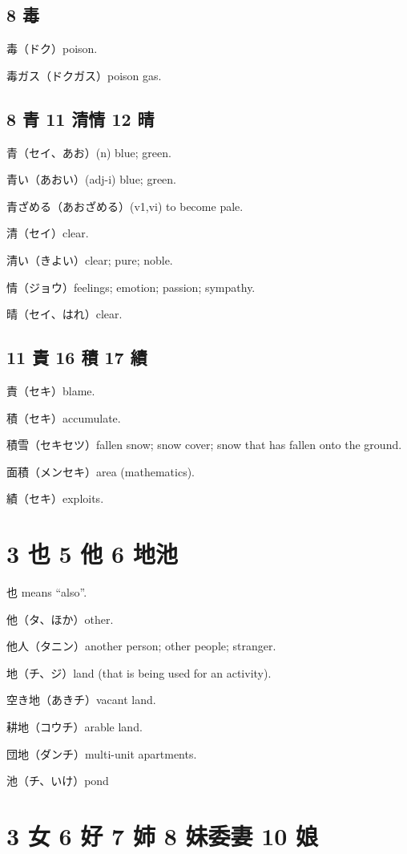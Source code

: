 \subsection{8 毒}

毒（ドク）poison.

毒ガス（ドクガス）poison gas.

\subsection{8 青 11 清情 12 晴}

青（セイ、あお）(n) blue; green.

青い（あおい）(adj-i) blue; green.

青ざめる（あおざめる）(v1,vi) to become pale.

清（セイ）clear.

清い（きよい）clear; pure; noble.

情（ジョウ）feelings; emotion; passion; sympathy.

晴（セイ、はれ）clear.

\subsection{11 責 16 積 17 績}

責（セキ）blame.

積（セキ）accumulate.

積雪（セキセツ）fallen snow;
snow cover;
snow that has fallen onto the ground.

面積（メンセキ）area (mathematics).

績（セキ）exploits.

\section{3 也 5 他 6 地池}

也 means ``also''.

他（タ、ほか）other.

他人（タニン）another person; other people; stranger.

地（チ、ジ）land (that is being used for an activity).

空き地（あきチ）vacant land.

耕地（コウチ）arable land.

団地（ダンチ）multi-unit apartments.

池（チ、いけ）pond

\section{3 女 6 好 7 姉 8 妹委妻 10 娘}

